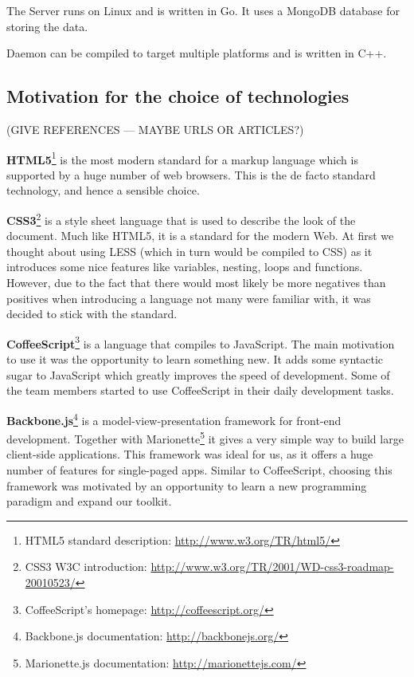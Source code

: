 \documentclass{l3proj}
\begin{document}
The Server runs on Linux and is written in Go. It uses a MongoDB database for storing the data.

Daemon can be compiled to target multiple platforms and is written in C++.

\subsection{Motivation for the choice of technologies}

(GIVE REFERENCES --- MAYBE URLS OR ARTICLES?)

\textbf{HTML5}\footnote{\raggedright{}HTML5 standard description: \url{http://www.w3.org/TR/html5/}} is the most modern standard for a markup language which is supported by a huge number of web browsers. This is the de facto standard technology, and hence a sensible choice.

\textbf{CSS3}\footnote{\raggedright{}CSS3 W3C introduction: \url{http://www.w3.org/TR/2001/WD-css3-roadmap-20010523/}} is a style sheet language that is used to describe the look of the document. Much like HTML5, it is a standard for the modern Web. At first we thought about using LESS (which in turn would be compiled to CSS) as it introduces some nice features like variables, nesting, loops and functions. However, due to the fact that there would most likely be more negatives than positives when introducing a language not many were familiar with, it was decided to stick with the standard.

\textbf{CoffeeScript}\footnote{\raggedright{}CoffeeScript's homepage: \url{http://coffeescript.org/}} is a language that compiles to JavaScript. The main motivation to use it was the opportunity to learn something new. It adds some syntactic sugar to JavaScript which greatly improves the speed of development. Some of the team members started to use CoffeeScript in their daily development tasks.

\textbf{Backbone.js}\footnote{\raggedright{}Backbone.js documentation: \url{http://backbonejs.org/}} is a model-view-presentation framework for front-end development. Together with Marionette\footnote{\raggedright{}Marionette.js documentation: \url{http://marionettejs.com/}} it gives a very simple way to build large client-side applications. This framework was ideal for us, as it offers a huge number of features for single-paged apps. Similar to CoffeeScript, choosing this framework was motivated by an opportunity to learn a new programming paradigm and expand our toolkit.
\end{document}
